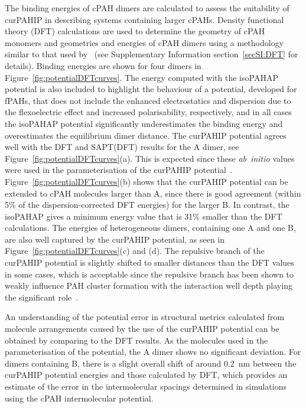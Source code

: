 The binding energies of cPAH dimers are calculated to assess the suitability of curPAHIP in describing systems containing larger cPAHs. Density functional theory (DFT) calculations are used to determine the geometry of cPAH monomers and geometries and energies of cPAH dimers using a methodology similar to that used by~\citet{Martin2018polar} (see Supplementary Information section~\ref{secSI:DFT} for details). Binding energies are shown for four dimers in Figure~\ref{fig:potentialDFTcurves}. The energy computed with the isoPAHAP potential is also included to highlight the behaviour of a potential, developed for fPAHs, that does not include the enhanced electrostatics and dispersion due to the flexoelectric effect and increased polarisability, respectively, and in all cases the isoPAHAP potential significantly underestimates the binding energy and overestimates the equilibrium dimer distance.
The curPAHIP potential agrees well with the DFT and SAPT(DFT) results for the A dimer, see Figure~\ref{fig:potentialDFTcurves}(a). This is expected since these \textit{ab~initio} values were used in the parameterisation of the curPAHIP potential~\cite{bowal2019ion}. 
Figure~\ref{fig:potentialDFTcurves}(b) shows that the curPAHIP potential can be extended to cPAH molecules larger than A, since there is good agreement (within 5\% of the dispersion-corrected DFT energies) for the larger B. In contrast, the isoPAHAP gives a minimum energy value that is 31\% smaller than the DFT calculations.
The energies of heterogeneous dimers, containing one A and one B, are also well captured by the curPAHIP potential, as seen in Figure~\ref{fig:potentialDFTcurves}(c) and (d). The repulsive branch of the curPAHIP potential is slightly shifted to smaller distances than the DFT values in some cases, which is acceptable since the repulsive branch has been shown to weakly influence PAH cluster formation with the interaction well depth playing the significant role~\cite{Pascazio2017}.

An understanding of the potential error in structural metrics calculated from molecule arrangements caused by the use of the curPAHIP potential can be obtained by comparing to the DFT results. As the molecules used in the parameterisation of the potential, the A dimer shows no significant deviation.  For dimers containing B, there is a slight overall shift of around 0.2~nm between the curPAHIP potential energies and those calculated by DFT, which provides an estimate of the error in the intermolecular spacings determined in simulations using the cPAH intermolecular potential.  

